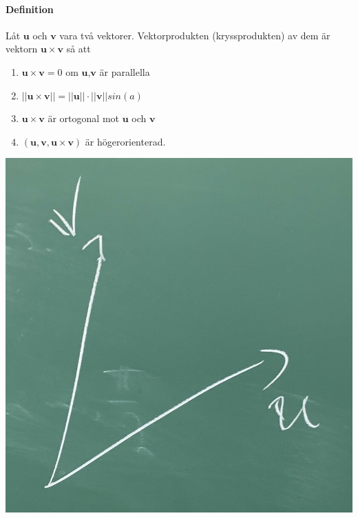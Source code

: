     \paragraph{Definition} Låt $\bm{u}$ och $\bm{v}$ vara två vektorer. Vektorprodukten (kryssprodukten) av dem är vektorn $\bm{u}\times \bm{v}$ så att 
    \begin{enumerate}
        \item $\bm{u}\times \bm{v} = 0$ om $\bm{u}$,$\bm{v}$ är parallella
        \item $||\bm{u}\times \bm{v}||=||\bm{u}||\cdot ||\bm{v}||sin(a)$ 
        \item $\bm{u}\times \bm{v}$ är ortogonal mot $\bm{u}$ och $\bm{v}$
        \item $(\bm{u},\bm{v}, \bm{u}\times \bm{v})$ är högerorienterad.
    \end{enumerate}
    \includegraphics[scale=0.10]{imgs/22-01-20-img09.jpg}